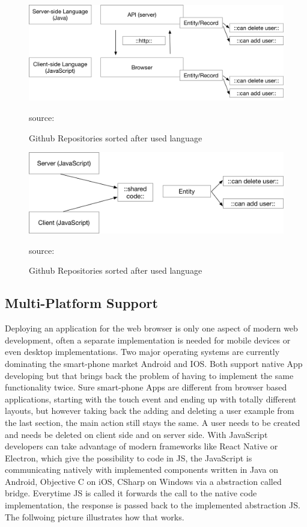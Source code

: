 \begin{figure}[hb]
	\centering
	\includegraphics[scale=0.5]{bilder/grundlagen/Entity1.png}
	\caption{Github Repositories sorted after used language} source:\cite{JS}
	\label{fig:JS}
\end{figure}
\begin{figure}[hb]
	\centering
	\includegraphics[scale=0.6]{bilder/grundlagen/Entity2.png}
	\caption{Github Repositories sorted after used language} source:\cite{JS}
	\label{fig:JS}
\end{figure}


\subsection{Multi-Platform Support}

Deploying an application for the web browser is only one aspect of modern web development, often a separate implementation is needed for mobile devices or even desktop implementations. Two major operating systems are currently dominating the smart-phone market Android and IOS. Both support native App developing but that brings back the problem of having to implement the same functionality twice. Sure smart-phone Apps are different from browser based applications, starting with the touch event and ending up with totally different layouts, but however taking back the adding and deleting a user example from the last section, the main action still stays the same. A user needs to be created and needs be deleted on client side and on server side. With JavaScript developers can take advantage of modern frameworks like React Native or Electron, which give the possibility to code in \gls{JS}, the JavaScript is communicating natively with implemented components written in Java on Android, Objective C on iOS, CSharp on Windows via a abstraction called bridge. Everytime \gls{JS} is called it forwards the call to the native code implementation, the response is passed back to the implemented abstraction \gls{JS}. The follwoing picture illustrates how that works.

